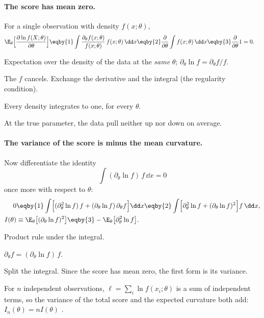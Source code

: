 \paragraph{The score has mean zero.} For a single observation with density
$f(x;\theta)$,
\begin{align}
  \E_\theta\Bigl[\frac{\partial\ln f(X;\theta)}{\partial\theta}\Bigr]
  &\eqby{1}\int\frac{\partial_\theta f(x;\theta)}{f(x;\theta)}\,f(x;\theta)\,\dd x
  \eqby{2}\frac{\partial}{\partial\theta}\int f(x;\theta)\,\dd x
  \eqby{3}\frac{\partial}{\partial\theta}1=0 .
  \label{3b:eq:score-mean}
\end{align}
\begin{explain}
  \item Expectation over the density of the data at the \emph{same}
        $\theta$; $\partial_\theta\ln f=\partial_\theta f/f$.
  \item The $f$ cancels. Exchange the derivative and the integral (the
        regularity condition).
  \item Every density integrates to one, for every $\theta$.
\end{explain}
At the true parameter, the data pull neither up nor down on average.

\paragraph{The variance of the score is minus the mean curvature.}
Now differentiate the identity
\[
  \int(\partial_\theta\ln f)\,f\,\dd x=0
\]
once more with respect to $\theta$:
\begin{align}
  0&\eqby{1}\int\Bigl[(\partial^2_\theta\ln f)\,f+(\partial_\theta\ln f)\,\partial_\theta f\Bigr]\dd x
   \eqby{2}\int\Bigl[\partial^2_\theta\ln f+(\partial_\theta\ln f)^2\Bigr]f\,\dd x ,
  \nonumber\\
  I(\theta)&\equiv\E_\theta\bigl[(\partial_\theta\ln f)^2\bigr]
   \eqby{3}-\E_\theta\bigl[\partial^2_\theta\ln f\bigr] .
  \label{3b:eq:fisher-identity}
\end{align}
\begin{explain}
  \item Product rule under the integral.
  \item $\partial_\theta f=(\partial_\theta\ln f)\,f$.
  \item Split the integral. Since the score has mean zero, the first form
        is its variance.
\end{explain}
For $n$ independent observations, $\ell=\sum_i\ln f(x_i;\theta)$ is a sum of
independent terms, so the variance of the total score and the expected
curvature both add: $I_n(\theta)=nI(\theta)$ .

